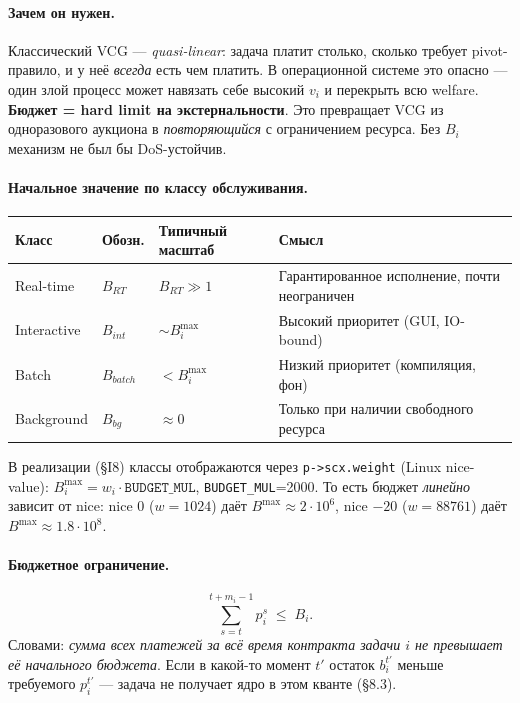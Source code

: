 \documentclass[11pt,a4paper]{article}
\begin{document}
\paragraph{Зачем он нужен.}
Классический VCG — \emph{quasi-linear}: задача платит столько, сколько
требует pivot-правило, и у неё \emph{всегда} есть чем платить.
В операционной системе это опасно — один злой процесс может навязать
себе высокий $v_i$ и перекрыть всю welfare. \textbf{Бюджет = hard
limit на экстернальности}. Это превращает VCG из одноразового
аукциона в \emph{повторяющийся} с ограничением ресурса. Без $B_i$
механизм не был бы DoS-устойчив.

\paragraph{Начальное значение по классу обслуживания.}
\begin{center}\small
\begin{tabular}{@{}llll@{}}
\toprule
Класс & Обозн. & Типичный масштаб & Смысл\\
\midrule
Real-time   & $B_{RT}$    & $B_{RT}\gg 1$   & Гарантированное исполнение, почти неограничен\\
Interactive & $B_{int}$   & $\sim B_i^{\max}$ & Высокий приоритет (GUI, IO-bound)\\
Batch       & $B_{batch}$ & $< B_i^{\max}$  & Низкий приоритет (компиляция, фон)\\
Background  & $B_{bg}$    & $\approx 0$     & Только при наличии свободного ресурса\\
\bottomrule
\end{tabular}
\end{center}

В реализации (§I8) классы отображаются через \texttt{p->scx.weight}
(Linux nice-value): $B_i^{\max}=w_i\cdot\mathtt{BUDGET\_MUL}$,
\texttt{BUDGET\_MUL}=2000. То есть бюджет \emph{линейно} зависит от
nice: nice 0 ($w=1024$) даёт $B^{\max}\approx 2\cdot 10^6$,
nice $-20$ ($w=88761$) даёт $B^{\max}\approx 1.8\cdot 10^8$.

\paragraph{Бюджетное ограничение.}
\[
\sum_{s=t}^{t+m_i-1} p_i^s \;\leq\; B_i.
\]
Словами: \emph{сумма всех платежей за всё время контракта задачи
$i$ не превышает её начального бюджета}. Если в какой-то момент
$t'$ остаток $b_i^{t'}$ меньше требуемого $p_i^{t'}$ — задача не
получает ядро в этом кванте (§8.3).
\end{document}
